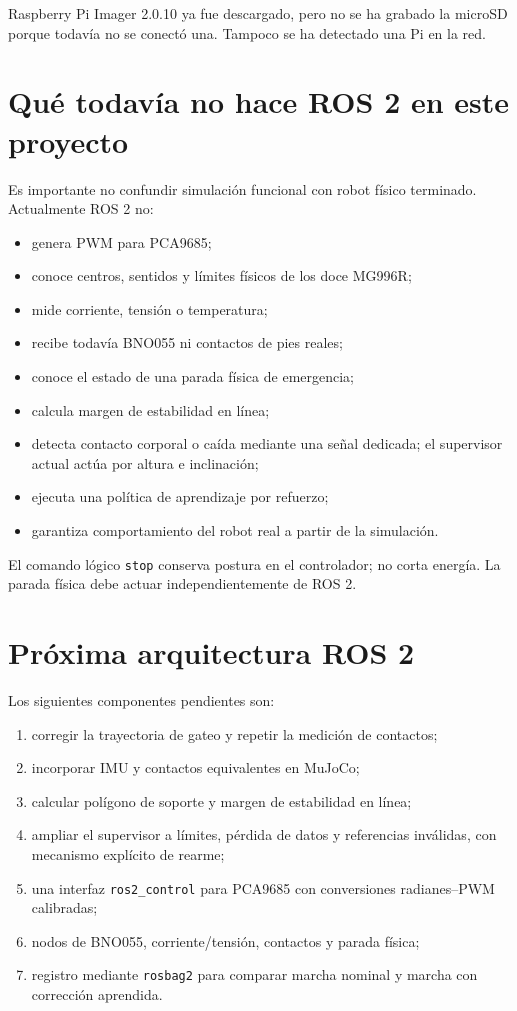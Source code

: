 \documentclass[11pt,a4paper]{article}
\begin{document}
Raspberry Pi Imager 2.0.10 ya fue descargado, pero no se ha grabado la microSD
porque todavía no se conectó una. Tampoco se ha detectado una Pi en la red.

\section{Qué todavía no hace ROS 2 en este proyecto}
Es importante no confundir simulación funcional con robot físico terminado.
Actualmente ROS 2 no:
\begin{itemize}
\item genera PWM para PCA9685;
\item conoce centros, sentidos y límites físicos de los doce MG996R;
\item mide corriente, tensión o temperatura;
\item recibe todavía BNO055 ni contactos de pies reales;
\item conoce el estado de una parada física de emergencia;
\item calcula margen de estabilidad en línea;
\item detecta contacto corporal o caída mediante una señal dedicada; el
  supervisor actual actúa por altura e inclinación;
\item ejecuta una política de aprendizaje por refuerzo;
\item garantiza comportamiento del robot real a partir de la simulación.
\end{itemize}

El comando lógico \texttt{stop} conserva postura en el controlador; no corta
energía. La parada física debe actuar independientemente de ROS 2.

\section{Próxima arquitectura ROS 2}
Los siguientes componentes pendientes son:
\begin{enumerate}
\item corregir la trayectoria de gateo y repetir la medición de contactos;
\item incorporar IMU y contactos equivalentes en MuJoCo;
\item calcular polígono de soporte y margen de estabilidad en línea;
\item ampliar el supervisor a límites, pérdida de datos y referencias inválidas,
  con mecanismo explícito de rearme;
\item una interfaz \texttt{ros2\_control} para PCA9685 con conversiones
  radianes--PWM calibradas;
\item nodos de BNO055, corriente/tensión, contactos y parada física;
\item registro mediante \texttt{rosbag2} para comparar marcha nominal y marcha
  con corrección aprendida.
\end{enumerate}
\end{document}
